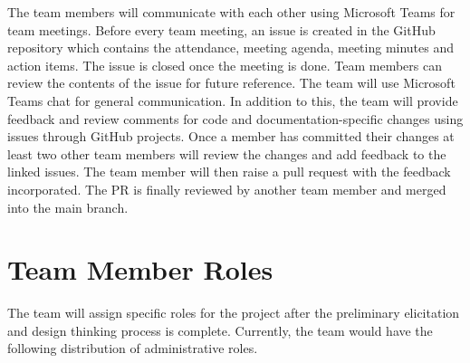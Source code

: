 \documentclass{article}
\begin{document}
The team members will communicate with each other using Microsoft Teams for team meetings.  Before every team meeting, an issue is created in the GitHub repository which contains the attendance, meeting agenda, meeting minutes and action items. The issue is closed once the meeting is done. Team members can review the contents of the issue for future reference. The team will use Microsoft Teams chat for general communication. 
In addition to this, the team will provide feedback and review comments for code and documentation-specific changes using issues through GitHub projects. Once a member has committed their changes at least two other team members will review the changes and add feedback to the linked issues. The team member will then raise a pull request with the feedback incorporated. The PR is finally reviewed by another team member and merged into the main branch. 

\section{Team Member Roles}
 
The team will assign specific roles for the project after the preliminary elicitation and design thinking process is complete. Currently, the team would have the following distribution of administrative roles.
\end{document}
